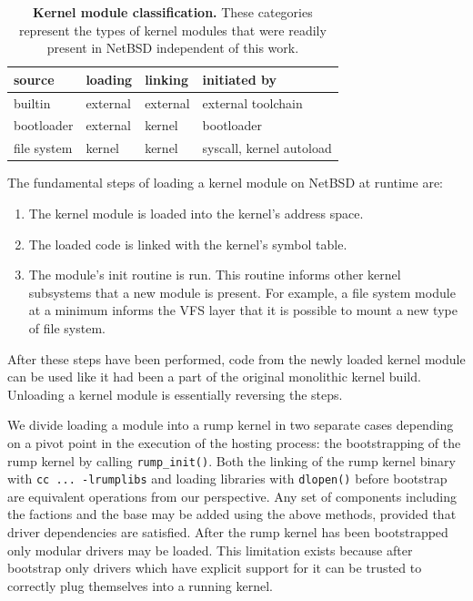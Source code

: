 \begin{table}
\begin{tabular}{|l|l|l|l|}
\hline
source & loading & linking & initiated by \\
\hline
\hline
builtin & external & external & external toolchain \\
\hline
bootloader & external & kernel & bootloader \\
\hline
file system & kernel & kernel & syscall, kernel autoload \\
\hline
\end{tabular}
\caption[Kernel module classification]{
\textbf{Kernel module classification.}
These categories represent the types of kernel modules that were readily
present in NetBSD independent of this work.
}
\label{tab:kernmod}
\end{table}

The fundamental steps of loading a kernel module on NetBSD at
runtime are:

\begin{enumerate}
\item	The kernel module is loaded into the kernel's address space.

\item   The loaded code is linked with the kernel's symbol table.

\item   The module's init routine is run.  This routine informs other kernel
	subsystems that a new module is present.  For example, a
	file system module at a minimum informs the VFS layer that
	it is possible to mount a new type of file system.
\end{enumerate}

After these steps have been performed, code from the newly loaded
kernel module can be used like it had been a part of the original
monolithic kernel build.  Unloading a kernel module is essentially
reversing the steps.

We divide loading a module into a rump kernel in two separate cases
depending on a pivot point in the execution of the hosting process: the bootstrapping of the
rump kernel by calling \verb+rump_init()+.  Both the linking of the rump
kernel binary with \texttt{cc~...~-lrumplibs} and loading libraries with
\texttt{dlopen()} before bootstrap are equivalent operations from our
perspective.  Any set of components including the factions and the base
may be added using the above methods, provided that driver dependencies
are satisfied.  After the rump kernel has been bootstrapped only modular
drivers may be loaded.  This limitation exists because after bootstrap
only drivers which have explicit support for it can be trusted to
correctly plug themselves into a running kernel.

